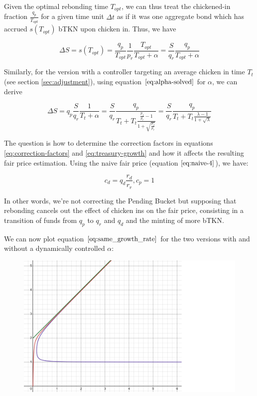 \documentclass{article}
\begin{document}
Given the optimal rebonding time $T_{opt}$, we can thus treat the chickened-in fraction $\frac{q_p}{T_{opt}}$ for a given time unit $\Delta t$ as if it was one aggregate bond which has accrued $s(T_{opt})$ bTKN upon chicken in. Thus, we have

\begin{equation}
  \label{}
  \Delta S = s(T_{opt}) = \frac{q_p}{T_{opt}} \frac{1}{p_r} \frac{T_{opt}}{T_{opt}+\alpha} = \frac{S}{q_r} \frac{q_p}{T_{opt}+\alpha}
\end{equation}

Similarly, for the version with a controller targeting an average chicken in time $T_t$ (see section \ref{sec:adjustment}), using equation $\ref{eq:alpha-solved}$ for $\alpha$, we can derive

\begin{equation}
  \label{}
  \Delta S = q_p \frac{S}{q_r} \frac{1}{T_t+\alpha}
  =  \frac{S}{q_r} \frac{q_p}{T_t+ T_t\frac{\frac{p_f}{p_r} - 1}{1 + \sqrt{\frac{p_f}{p_r}}}}  
  =  \frac{S}{q_r} \frac{q_p}{T_t+ T_t\frac{\lambda - 1}{1 + \sqrt{\lambda}}}  
\end{equation}


The question is how to determine the correction factors in equations \ref{eq:correction-factors} and \ref{eq:treasury-growth} and how it affects the resulting fair price estimation. Using the naive fair price (equation $\ref{eq:naive-4}$), we have:

\begin{equation}
  \label{}
   c_d=q_d \frac{r_d}{r_r}, c_p=1
\end{equation}

In other words, we're not correcting the Pending Bucket but supposing that rebonding cancels out the effect of chicken ins on the fair price, consisting in a transition of funds from $q_p$ to $q_r$ and $q_d$ and the minting of more bTKN.

\pagebreak

We can now plot equation $\ref{eq:same_growth_rate}$ for the two versions with and without a dynamically controlled $\alpha$:

\begin{figure}[h]
    \centering
    \includegraphics[width=0.5\linewidth]{./ChickenBonds_Whitepaper_growth_price.png}
\end{figure}
\end{document}
